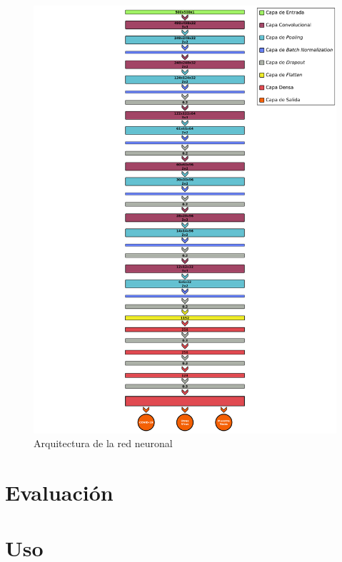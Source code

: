 \documentclass{uc3mpracticas}
\begin{document}
  \begin{figure}[H]
    \centering
    \includegraphics[width=\textwidth]{Images/CNN.png}
    \caption{Arquitectura de la red neuronal}
  \end{figure}

  \newpage

  \section{Evaluación}

  \newpage
  \section{Uso}
\end{document}
